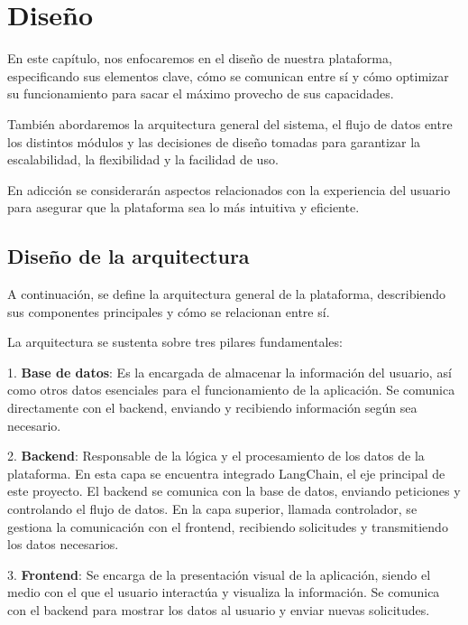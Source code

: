 \chapter{Diseño}

En este capítulo, nos enfocaremos en el diseño de nuestra plataforma, especificando sus elementos clave, cómo se comunican entre sí y cómo optimizar su funcionamiento para sacar el máximo provecho de sus capacidades. 

También abordaremos la arquitectura general del sistema, el flujo de datos entre los distintos módulos y las decisiones de diseño tomadas para garantizar la escalabilidad, la flexibilidad y la facilidad de uso. 

En adicción se considerarán aspectos relacionados con la experiencia del usuario para asegurar que la plataforma sea lo más intuitiva y eficiente.  

\newpage



\section{Diseño de la arquitectura}

A continuación, se define la arquitectura general de la plataforma, describiendo sus componentes principales y cómo se relacionan entre sí.

La arquitectura se sustenta sobre tres pilares fundamentales:

1. \textbf{Base de datos}: Es la encargada de almacenar la información del usuario, así como otros datos esenciales para el funcionamiento de la aplicación. Se comunica directamente con el backend, enviando y recibiendo información según sea necesario.

2. \textbf{Backend}: Responsable de la lógica y el procesamiento de los datos de la plataforma. En esta capa se encuentra integrado LangChain, el eje principal de este proyecto. El backend se comunica con la base de datos, enviando peticiones y  controlando el flujo de datos. En la capa superior, llamada controlador, se gestiona la comunicación con el frontend, recibiendo solicitudes y transmitiendo los datos necesarios.

3. \textbf{Frontend}: Se encarga de la presentación visual de la aplicación, siendo el medio con el que el usuario interactúa y visualiza la información. Se comunica con el backend para mostrar los datos al usuario y enviar nuevas solicitudes.

